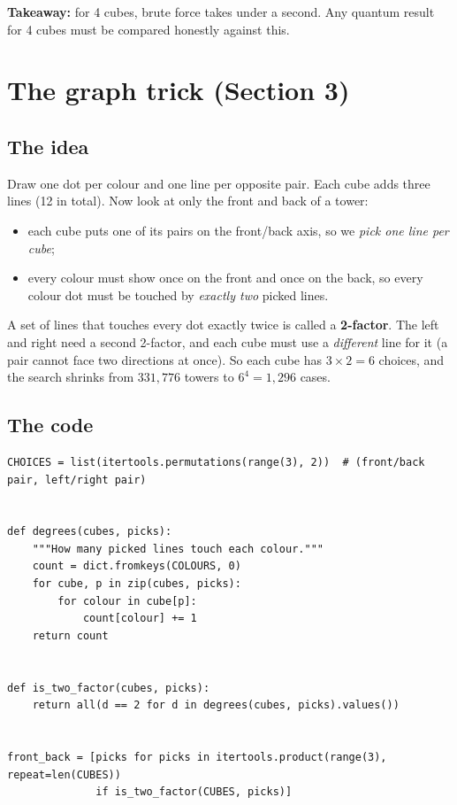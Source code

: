 \documentclass[11pt]{article}
\begin{document}
\textbf{Takeaway:} for 4 cubes, brute force takes under a second. Any quantum
result for 4 cubes must be compared honestly against this.

\section{The graph trick (Section 3)}

\subsection{The idea}

Draw one dot per colour and one line per opposite pair. Each cube adds three
lines (12 in total). Now look at only the front and back of a tower:
\begin{itemize}
  \item each cube puts one of its pairs on the front/back axis, so we
        \emph{pick one line per cube};
  \item every colour must show once on the front and once on the back, so
        every colour dot must be touched by \emph{exactly two} picked lines.
\end{itemize}
A set of lines that touches every dot exactly twice is called a
\textbf{2-factor}. The left and right need a second 2-factor, and each cube must
use a \emph{different} line for it (a pair cannot face two directions at once).
So each cube has $3 \times 2 = 6$ choices, and the search shrinks from
$331{,}776$ towers to $6^4 = 1{,}296$ cases.

\subsection{The code}

\begin{lstlisting}
CHOICES = list(itertools.permutations(range(3), 2))  # (front/back pair, left/right pair)


def degrees(cubes, picks):
    """How many picked lines touch each colour."""
    count = dict.fromkeys(COLOURS, 0)
    for cube, p in zip(cubes, picks):
        for colour in cube[p]:
            count[colour] += 1
    return count


def is_two_factor(cubes, picks):
    return all(d == 2 for d in degrees(cubes, picks).values())


front_back = [picks for picks in itertools.product(range(3), repeat=len(CUBES))
              if is_two_factor(CUBES, picks)]
\end{lstlisting}
\end{document}
